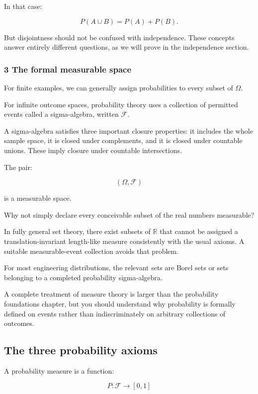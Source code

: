In that case:

\[
 P(A\cup B)=P(A)+P(B).
\]

But disjointness should not be confused with independence. These concepts answer entirely different questions, as we will prove in the independence section.

\subsubsection{3 The formal measurable space}\label{02-foundations-ii-ch023-the-formal-measurable-space}

For finite examples, we can generally assign probabilities to every subset of \(\Omega\).

For infinite outcome spaces, probability theory uses a collection of permitted events called a sigma-algebra, written \(\mathcal F\).

A sigma-algebra satisfies three important closure properties: it includes the whole sample space, it is closed under complements, and it is closed under countable unions. These imply closure under countable intersections.

The pair:

\[
 (\Omega,\mathcal F)
\]

is a measurable space.

Why not simply declare every conceivable subset of the real numbers measurable?

In fully general set theory, there exist subsets of \(\mathbb R\) that cannot be assigned a translation-invariant length-like measure consistently with the usual axioms. A suitable measurable-event collection avoids that problem.

For most engineering distributions, the relevant sets are Borel sets or sets belonging to a completed probability sigma-algebra.

A complete treatment of measure theory is larger than the probability foundations chapter, but you should understand why probability is formally defined on events rather than indiscriminately on arbitrary collections of outcomes.

\subsection{The three probability axioms}\label{02-foundations-ii-ch023-the-three-probability-axioms}

A probability measure is a function:

\[
 P:\mathcal F\rightarrow[0,1]
\]

